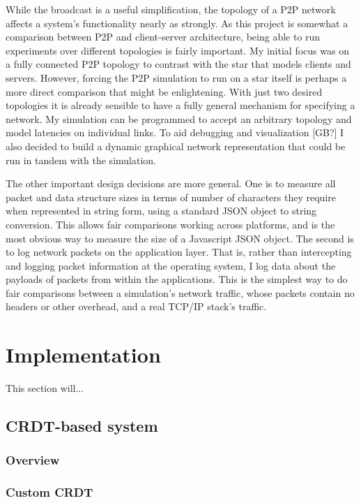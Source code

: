 \documentclass[12pt,a4paper,twoside,openright]{report}
\begin{document}
While the broadcast is a useful simplification, the topology of a P2P network affects a system's functionality nearly as strongly. As this project is somewhat a comparison between P2P and client-server architecture, being able to run experiments over different topologies is fairly important. My initial focus was on a fully connected P2P topology to contrast with the star that models clients and servers. However, forcing the P2P simulation to run on a star itself is perhaps a more direct comparison that might be enlightening. With just two desired topologies it is already sensible to have a fully general mechanism for specifying a network. My simulation can be programmed to accept an arbitrary topology and model latencies on individual links. To aid debugging and visualization [GB?] I also decided to build a dynamic graphical network representation that could be run in tandem with the simulation.

The other important design decisions are more general. One is to measure all packet and data structure sizes in terms of number of characters they require when represented in string form, using a standard JSON object to string conversion. This allows fair comparisons working across platforms, and is the most obvious way to measure the size of a Javascript JSON object. The second is to log network packets on the application layer. That is, rather than intercepting and logging packet information at the operating system, I log data about the payloads of packets from within the applications. This is the simplest way to do fair comparisons between a simulation's network traffic, whose packets contain no headers or other overhead, and a real TCP/IP stack's traffic.


\chapter{Implementation}

This section will...

\section{CRDT-based system}

	\subsection{Overview}
	
	\subsection{Custom CRDT}
	
\end{document}
